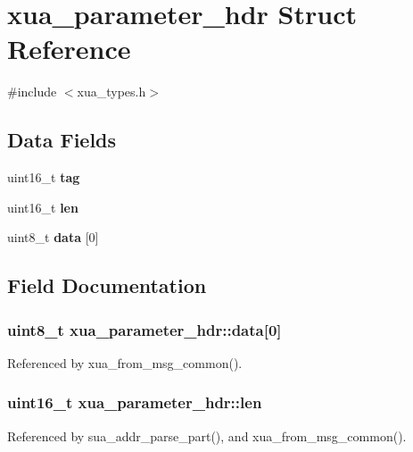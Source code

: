 \section{xua\+\_\+parameter\+\_\+hdr Struct Reference}
\label{structxua__parameter__hdr}


{\ttfamily \#include $<$xua\+\_\+types.\+h$>$}

\subsection*{Data Fields}
\begin{DoxyCompactItemize}
\item 
uint16\+\_\+t {\bf tag}
\item 
uint16\+\_\+t {\bf len}
\item 
uint8\+\_\+t {\bf data} [0]
\end{DoxyCompactItemize}


\subsection{Field Documentation}
\subsubsection[{data}]{\setlength{\rightskip}{0pt plus 5cm}uint8\+\_\+t xua\+\_\+parameter\+\_\+hdr\+::data[0]}\label{structxua__parameter__hdr_a38ef0340aba8f59386a042d968de553b}


Referenced by xua\+\_\+from\+\_\+msg\+\_\+common().

\subsubsection[{len}]{\setlength{\rightskip}{0pt plus 5cm}uint16\+\_\+t xua\+\_\+parameter\+\_\+hdr\+::len}\label{structxua__parameter__hdr_aaa3ded60b9811155f3c5c2ee9f531cfa}


Referenced by sua\+\_\+addr\+\_\+parse\+\_\+part(), and xua\+\_\+from\+\_\+msg\+\_\+common().

